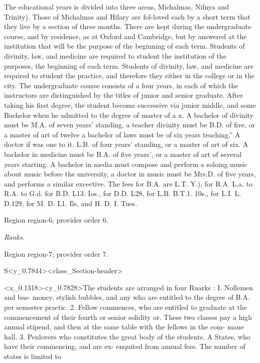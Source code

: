 \documentclass[11pt]{article}
\begin{document}
The educational years is divided into three areas, Michalmas, Nifnya and Trinity). Those of Michalmas and Hilary are fol-loved each by a short term that they live by a section of three months. There are kept during the undergraduate course, and by residence, as at Oxford and Cambridge, but by answered at the institution that will be the purpose of the beginning of each term. Students of divinity, law, and medicine are required to student the institution of the purposes, the beginning of each term. Students of divinity, law, and medicine are required to student the practice, and therefore they either in the college or in the city. The undergraduate course consists of a four years, in each of which the instructors are distinguished by the titles of junior and senior graduate. After taking his first degree, the student become successive via junior middle, and some Bachelor when he admitted to the degree of master of a x. A bachelor of divinity must be M.A. of seven years’ standing, a teacher divinity must be B.D. of five, or a master of art of twelve a bachelor of laws must be of six years teaching.” A doctor if was one to it. L.B. of four years’ standing, or a master of art of six. A bachelor in medicine must be B.A. of five years’, or a master of art of several years starting. A bachelor in media must compose and perform a soloing music about music before the university, a doctor in music must be Mrs.D. of five years, and performs a similar excective. The fees for B.A. are L.T. Y.), for R.A. L.a. to R.A. to G.d. for B.D. L13. Ios., for D.D. L28, for L.B. B.T.1. 10s., for L.I. L. D.129, for M. D. L1. Ils, and H. D. I. Tues.
\par

{\scriptsize\color{gray} Region region-6; provider order 6.\par}
\medskip

{\small\itshape Ranks.\par}

{\scriptsize\color{gray} Region region-7; provider order 7.\par}
\medskip

S<y\_0.7844><class\_Section-header>

<x\_0.1318><y\_0.7828>The students are arranged in four Ruarks : I. Nollemen and bas- money, stylish bubbles, and any who are entitled to the degree of B.A. per semester practic. 2. Fellow commences, who are entitled to graduate at the commencement of their fourth or senior solidity or. These two classes pay a high annual stipend, and then at the same table with the fellows in the com- mane hall. 3. Penlovers who constitutes the great body of the students. A States, who have their commencing, and are ex- enquited from annual fees. The number of states is limited to
\par
\end{document}

